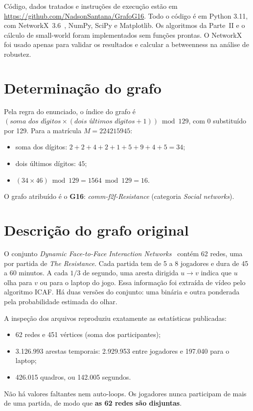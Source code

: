 \documentclass[sigconf]{acmart}
\begin{document}
Código, dados tratados e instruções de execução estão em
\url{https://github.com/NadsonSantana/GrafoG16}. Todo o código é em Python 3.11, com
NetworkX~3.6~\cite{hagberg2008networkx}, NumPy, SciPy e Matplotlib. Os algoritmos da Parte~II e o
cálculo de small-world foram implementados sem funções prontas. O NetworkX foi usado apenas para
validar os resultados e calcular a betweenness na análise de robustez.

\section{Determinação do grafo}

Pela regra do enunciado, o índice do grafo é
$(\textit{soma dos dígitos} \times (\textit{dois últimos dígitos} + 1)) \bmod 129$, com 0
substituído por 129. Para a matrícula $M = 224215945$:
\begin{itemize}
  \item soma dos dígitos: $2+2+4+2+1+5+9+4+5 = 34$;
  \item dois últimos dígitos: $45$;
  \item $(34 \times 46) \bmod 129 = 1564 \bmod 129 = 16$.
\end{itemize}
O grafo atribuído é o \textbf{G16}: \textit{comm-f2f-Resistance} (categoria \textit{Social networks}).

\section{Descrição do grafo original}

O conjunto \textit{Dynamic Face-to-Face Interaction Networks}~\cite{kumar2021deception,bai2019predicting}
contém 62 redes, uma por partida de \textit{The Resistance}. Cada partida tem de 5 a 8 jogadores e
dura de 45 a 60 minutos. A cada $1/3$ de segundo, uma aresta dirigida $u \rightarrow v$ indica que
$u$ olha para $v$ ou para o laptop do jogo. Essa informação foi extraída de vídeo pelo algoritmo ICAF.
Há duas versões do conjunto: uma binária e outra ponderada pela probabilidade estimada do olhar.

A inspeção dos arquivos reproduziu exatamente as estatísticas publicadas:
\begin{itemize}
  \item 62 redes e 451 vértices (soma dos participantes);
  \item 3.126.993 arestas temporais: 2.929.953 entre jogadores e 197.040 para o laptop;
  \item 426.015 quadros, ou 142.005 segundos.
\end{itemize}
Não há valores faltantes nem auto-loops. Os jogadores nunca participam de mais de uma partida, de
modo que \textbf{as 62 redes são disjuntas}.
\end{document}
